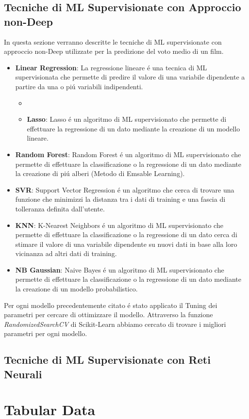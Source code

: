 \documentclass[../../Report.tex]{subfiles}
\begin{document}
\subsection{Tecniche di ML Supervisionate con Approccio non-Deep}
In questa sezione verranno descritte le tecniche di ML supervisionate con approccio non-Deep utilizzate per la predizione del voto medio di un film.
\begin{itemize}
    \item \textbf{Linear Regression}: La regressione lineare é una tecnica di ML supervisionata che permette di predire il valore di una variabile dipendente a partire da una o piú variabili indipendenti.
    \begin{itemize}
        \item \item \textbf{Lasso}: Lasso é un algoritmo di ML supervisionato che permette di effettuare la regressione di un dato mediante la creazione di un modello lineare.
    \end{itemize}
    \item \textbf{Random Forest}: Random Forest é un algoritmo di ML supervisionato che permette di effettuare la classificazione o la regressione di un dato mediante la creazione di piú alberi (Metodo di Emsable Learning).
    \item \textbf{SVR}: Support Vector Regression é un algoritmo che cerca di trovare una funzione che minimizzi la distanza tra i dati di training e una fascia di tolleranza definita dall'utente.
    \item \textbf{KNN}: K-Nearest Neighbors é un algoritmo di ML supervisionato che permette di effettuare la classificazione o la regressione di un dato cerca di stimare il valore di una variabile dipendente su nuovi dati in base alla loro vicinanza ad altri dati di training.
    \item \textbf{NB Gaussian}: Naive Bayes é un algoritmo di ML supervisionato che permette di effettuare la classificazione o la regressione di un dato mediante la creazione di un modello probabilistico.
\end{itemize}

Per ogni modello precedentemente citato é stato applicato il Tuning dei parametri per cercare di ottimizzare il modello.
Attraverso la funzione \textit{RandomizedSearchCV} di Scikit-Learn abbiamo cercato di trovare i migliori parametri per ogni modello.

\subsection{Tecniche di ML Supervisionate con Reti Neurali}
\section*{Tabular Data}
\end{document}
